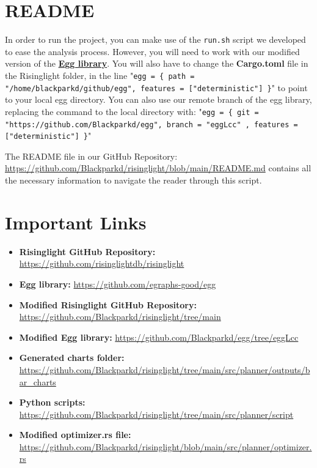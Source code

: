 \documentclass[a4paper,12pt]{scrreprt}
\begin{document}
\section{README}

In order to run the project, you can make use of the \texttt{run.sh} script we developed to ease the analysis process. However, you will need to work with our modified version of the \textbf{\href{https://github.com/Blackparkd/egg/tree/eggLcc}{Egg library}}. You will also have to change the \textbf{Cargo.toml} file in the Risinglight folder, in the line "\texttt{egg = \{ path = "/home/blackparkd/github/egg", features = ["deterministic"] \}}" to point to your local egg directory. You can also use our remote branch of the egg library, replacing the command to the local directory with: "\texttt{egg = \{ git = "https://github.com/Blackparkd/egg", branch = "eggLcc" , features = ["deterministic"] \}}" 

The README file in our GitHub Repository: \url{https://github.com/Blackparkd/risinglight/blob/main/README.md} contains all the necessary information to navigate the reader through this script. \\

\section{Important Links}
\begin{itemize}
    \item \textbf{Risinglight GitHub Repository:} \url{https://github.com/risinglightdb/risinglight}
    \item \textbf{Egg library:} \url{https://github.com/egraphs-good/egg}
    \item \textbf{Modified Risinglight GitHub Repository:} \url{https://github.com/Blackparkd/risinglight/tree/main}
    \item \textbf{Modified Egg library:} \url{https://github.com/Blackparkd/egg/tree/eggLcc}
    \item \textbf{Generated charts folder:} \url{https://github.com/Blackparkd/risinglight/tree/main/src/planner/outputs/bar_charts}
    \item \textbf{Python scripts:} \url{https://github.com/Blackparkd/risinglight/tree/main/src/planner/script}
    \item \textbf{Modified optimizer.rs file:} \url{https://github.com/Blackparkd/risinglight/blob/main/src/planner/optimizer.rs}
\end{itemize}
\end{document}

